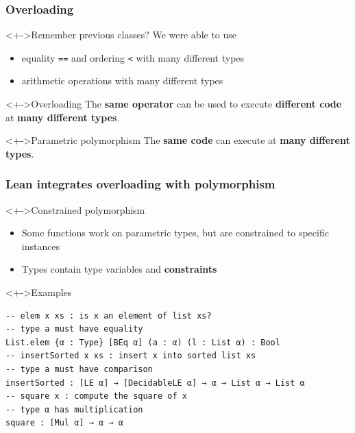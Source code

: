 \documentclass{beamer}
\subtitle{Type Classes --- Overloading in Lean}
\begin{document}
\begin{frame}
  \titlepage
\end{frame}
\begin{frame}[fragile]
  \frametitle{Overloading}
  \begin{block}<+->{Remember previous classes?}
    We were able to use
    \begin{itemize}
    \item equality \texttt{==} and ordering \texttt{<} with many different types
    \item arithmetic operations with many different types
    \end{itemize}
  \end{block}
  \begin{block}<+->{Overloading}
    The \textbf{same operator} can be used to execute \textbf{different code} at \textbf{many different types}. 
  \end{block}
  \begin{block}<+->{Parametric polymorphism}
    The \textbf{same code} can execute at \textbf{many different types}.
  \end{block}
\end{frame}
\begin{frame}[fragile]
  \frametitle{Lean integrates overloading with polymorphism}
  \begin{block}<+->{Constrained polymorphism}
    \begin{itemize}
    \item Some functions work on parametric types, but are constrained to specific instances
    \item Types contain type variables and \textbf{constraints}
    \end{itemize}
  \end{block}
  \begin{block}<+->{Examples}
\begin{lstlisting}
-- elem x xs : is x an element of list xs?
-- type a must have equality
List.elem {α : Type} [BEq α] (a : α) (l : List α) : Bool
-- insertSorted x xs : insert x into sorted list xs
-- type a must have comparison
insertSorted : [LE α] → [DecidableLE α] → α → List α → List α
-- square x : compute the square of x
-- type α has multiplication
square : [Mul α] → α → α
\end{lstlisting}
  \end{block}
\end{frame}
\end{document}
